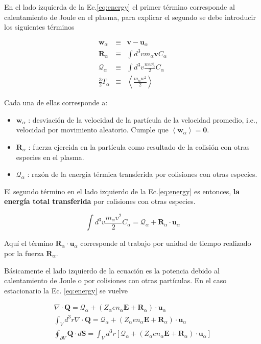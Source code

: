 \documentclass[11pt]{article}
\theoremstyle{definition}
\begin{document}
  En el lado izquierda de la Ec.\eqref{eq:energy} el primer t\'ermino corresponde al calentamiento de Joule en el plasma, para explicar el segundo se debe introducir los siguientes t\'erminos

  \begin{eqnarray}
    \textbf{w}_\alpha &\equiv& \textbf{v} - \textbf{u}_\alpha \nonumber\\
    \textbf{R}_\alpha &\equiv& \int d^3v m_\alpha\textbf{v}C_\alpha \nonumber\\
    \mathcal{Q}_\alpha &\equiv& \int d^3v \frac{mw_\alpha^2}{2}C_\alpha \nonumber\\
    \frac{3}{2}T_\alpha &\equiv& \left<\frac{m_\alpha w^2}{2}\right> \label{eq:temp}
  \end{eqnarray}

  Cada una de ellas corresponde a:
  \begin{itemize}
    \item $\textbf{w}_\alpha$ : desviaci\'on de la velocidad de la part\'icula de la velocidad promedio, i.e., velocidad por movimiento aleatorio. Cumple que $\left<\textbf{w}_\alpha\right> = \textbf{0}$.
    \item $\textbf{R}_\alpha$ : fuerza ejercida en la part\'icula como resultado de la colisi\'on con otras especies en el plasma.
    \item $\mathcal{Q}_\alpha$ : raz\'on de la energ\'ia t\'ermica transferida por colisiones con otras especies. 
  \end{itemize}

  El segundo t\'ermino en el lado izquierdo de la Ec.\eqref{eq:energy} es entonces, \textbf{la energ\'ia total transferida} por colisiones con otras especies.

  \begin{equation}
     \int d^3v \frac{m_\alpha v^2}{2}C_\alpha = \mathcal{Q}_\alpha + \textbf{R}_\alpha\cdot\textbf{u}_\alpha
  \end{equation}

  Aqu\'i el t\'ermino $\textbf{R}_\alpha\cdot\textbf{u}_\alpha$ corresponde al trabajo por unidad de tiempo realizado por la fuerza $\textbf{R}_\alpha$.

  B\'asicamente el lado izquierdo de la ecuaci\'on es la potencia debido al calentamiento de Joule o por colisiones con otras part\'iculas. En el caso estacionario la Ec. \eqref{eq:energy} se vuelve

  \begin{eqnarray}
  \nabla\cdot\textbf{Q} = \mathcal{Q}_\alpha + (Z_\alpha e n_\alpha\textbf{E} + \textbf{R}_\alpha)\cdot\textbf{u}_\alpha \nonumber\\
    \int_V d^3r \nabla\cdot\textbf{Q} = \mathcal{Q}_\alpha + (Z_\alpha e n_\alpha\textbf{E} + \textbf{R}_\alpha)\cdot\textbf{u}_\alpha\nonumber\\
    \oint_{\partial V} \textbf{Q}\cdot d\textbf{S} = \int_V d^3r\left[\mathcal{Q}_\alpha + (Z_\alpha e n_\alpha\textbf{E} + \textbf{R}_\alpha)\cdot\textbf{u}_\alpha\right] \nonumber
    \end{eqnarray}
\end{document}
